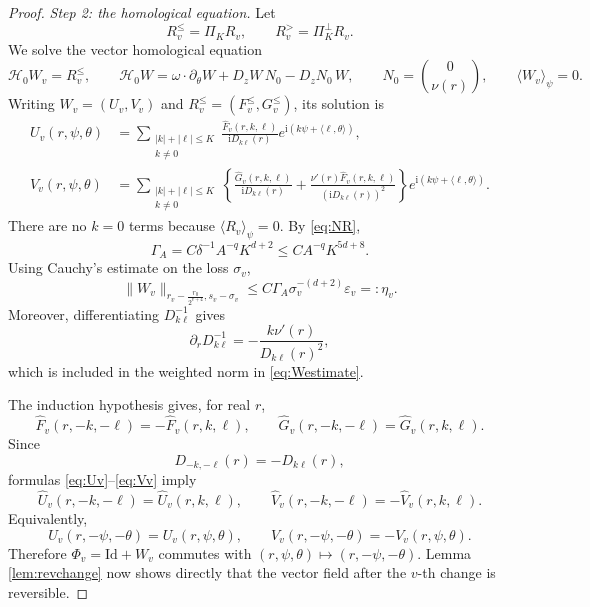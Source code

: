 \documentclass[10pt,a4paper]{amsart}
\newcommand{\Id}{\mathrm{Id}}
\newcommand{\av}[1]{\langle #1\rangle}
\newcommand{\eps}{\varepsilon}
\newcommand{\ii}{\mathrm i}
\newcommand{\norm}[1]{\lVert #1\rVert}
\begin{document}
\begin{proof}
\smallskip
\noindent\emph{Step 2: the homological equation.}
Let
\[
 R_v^{\leq}=\Pi_KR_v,\qquad R_v^>=\Pi_K^\perp R_v.
\]
We solve the vector homological equation
\begin{equation}\label{eq:homological}
 \mathcal H_0W_v=R_v^{\leq},\qquad
 \mathcal H_0W
 =\omega\cdot\partial_\theta W+
 D_zW\,N_0-D_zN_0\,W,\qquad
 N_0=\binom0{\nu(r)},
\qquad \av{W_v}_{\psi}=0.
\end{equation}
Writing $W_v=(U_v,V_v)$ and
$R_v^{\leq}=(F_v^{\leq},G_v^{\leq})$, its solution is
\begin{align}
 U_v(r,\psi,\theta)
 &=\sum_{\substack{|k|+|\ell|\leq K\\k\neq0}}
 \frac{\widehat F_v(r,k,\ell)}
 {\ii D_{k\ell}(r)}
 e^{\ii(k\psi+\langle\ell,\theta\rangle)},\label{eq:Uv}\\
 V_v(r,\psi,\theta)
 &=\sum_{\substack{|k|+|\ell|\leq K\\k\neq0}}
 \left\{
 \frac{\widehat G_v(r,k,\ell)}
 {\ii D_{k\ell}(r)}
 +\frac{\nu'(r)\widehat F_v(r,k,\ell)}
 {(\ii D_{k\ell}(r))^2}
 \right\}
 e^{\ii(k\psi+\langle\ell,\theta\rangle)}.
\label{eq:Vv}
\end{align}
There are no $k=0$ terms because $\av{R_v}_{\psi}=0$.
By \eqref{eq:NR},
\begin{equation}\label{eq:Gamma}
 \Gamma_A=
 C\delta^{-1}A^{-q}K^{d+2}
 \leq CA^{-q}K^{5d+8}.
\end{equation}
Using Cauchy's estimate on the loss $\sigma_v$,
\begin{equation}\label{eq:Westimate}
 \norm{W_v}_{r_v-\frac{r_0}{2^{v+4}},s_v-\sigma_v}
 \leq
 C\Gamma_A\sigma_v^{-(d+2)}\eps_v
 =:\eta_v.
\end{equation}
Moreover, differentiating $D_{k\ell}^{-1}$ gives
\[
 \partial_r D_{k\ell}^{-1}
 =-\frac{k\nu'(r)}{D_{k\ell}(r)^2},
\]
which is included in the weighted norm in \eqref{eq:Westimate}.

The induction hypothesis gives, for real $r$,
\begin{equation}\label{eq:FourierParity}
 \widehat F_v(r,-k,-\ell)=-\widehat F_v(r,k,\ell),
 \qquad
 \widehat G_v(r,-k,-\ell)= \widehat G_v(r,k,\ell).
\end{equation}
Since
\begin{equation}\label{eq:divisorParity}
 D_{-k,-\ell}(r)=-D_{k\ell}(r),
\end{equation}
formulas \eqref{eq:Uv}--\eqref{eq:Vv} imply
\[
 \widehat U_v(r,-k,-\ell)=\widehat U_v(r,k,\ell),
 \qquad
 \widehat V_v(r,-k,-\ell)=-\widehat V_v(r,k,\ell).
\]
Equivalently,
\begin{equation}\label{eq:Wparity}
 U_v(r,-\psi,-\theta)=U_v(r,\psi,\theta),\qquad
 V_v(r,-\psi,-\theta)=-V_v(r,\psi,\theta).
\end{equation}
Therefore $\Phi_v=\Id+W_v$ commutes with
$(r,\psi,\theta)\mapsto(r,-\psi,-\theta)$.  Lemma
\ref{lem:revchange} now shows directly that the vector field after the
$v$-th change is reversible.


\end{proof}
\end{document}
